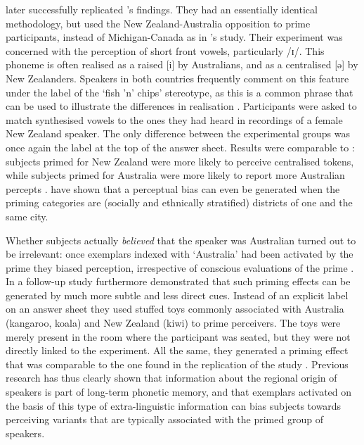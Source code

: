 \textcite{hayetal2006a} later successfully replicated \citeauthor{niedzielski1999}'s findings.
They had an essentially identical methodology, but used the New Zealand-Australia opposition to prime participants, instead of Michigan-Canada as in \citeauthor{niedzielski1999}'s study.
Their experiment was concerned with the perception of short front vowels, particularly /ɪ/.
This phoneme is often realised as a raised [i] by Australians, and as a centralised [ə] by New Zealanders.
Speakers in both countries frequently comment on this feature under the label of the `fish 'n' chips' stereotype, as this is a common phrase that can be used to illustrate the differences in realisation \parencite[cf.][354]{hayetal2006a}.
Participants were asked to match synthesised vowels to the ones they had heard in recordings of a female New Zealand speaker.
The only difference between the experimental groups was once again the label at the top of the answer sheet.
Results were comparable to \citealt{niedzielski1999}: subjects primed for New Zealand were more likely to perceive centralised tokens, while subjects primed for Australia were more likely to report more Australian percepts \parencite[cf.][359--363]{hayetal2006a}.
\textcite{jannedyetal2011} have shown that a perceptual bias can even be generated when the priming categories are (socially and ethnically stratified) districts of one and the same city.

Whether subjects actually \emph{believed} that the speaker was Australian turned out to be irrelevant: once exemplars indexed with `Australia' had been activated by the prime they biased perception, irrespective of conscious evaluations of the prime \parencite[cf.][374]{hayetal2006a}.
In a follow-up study \textcite{haydrager2010} furthermore demonstrated that such priming effects can be generated by much more subtle and less direct cues.
Instead of an explicit label on an answer sheet they used stuffed toys commonly associated with Australia (kangaroo, koala) and New Zealand (kiwi) to prime perceivers.
The toys were merely present in the room where the participant was seated, but they were not directly linked to the experiment.
All the same, they generated a priming effect that was comparable to the one found in the replication of the \citeauthor{niedzielski1999} study \parencite[cf.][871--872 and 874--875]{haydrager2010}.
Previous research has thus clearly shown that information about the regional origin of speakers is part of long-term phonetic memory, and that exemplars activated on the basis of this type of extra-linguistic information can bias subjects towards perceiving variants that are typically associated with the primed group of speakers.

